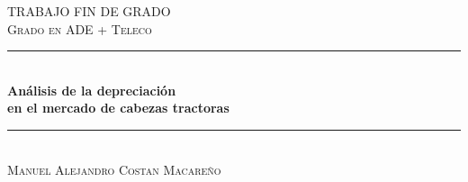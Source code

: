 \begin{titlepage}

\newcommand{\HRule}{\rule{\linewidth}{0.5mm}} %

\center %
 

\textsc{\LARGE TRABAJO FIN DE GRADO}\\[1.5cm] 
\textsc{\Large Grado en ADE + Teleco}\\[0.5cm] %


\HRule \\[0.4cm]
{ \huge \bfseries Análisis de la depreciación  \\[0.4\baselineskip]
en el mercado de cabezas tractoras}\\[0.4cm] %
\HRule \\[1.5cm]
 


\Large %
\textsc{Manuel Alejandro Costan Macareño}\\[3cm] %


\end{titlepage}
